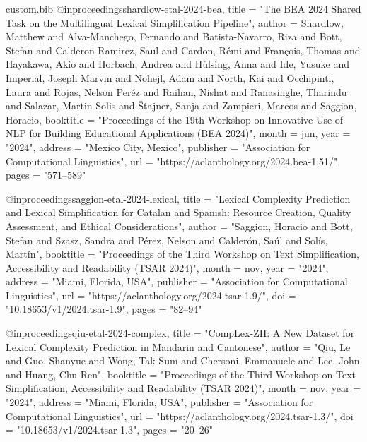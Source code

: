 \begin{filecontents*}[overwrite]{custom.bib}
@inproceedings{shardlow-etal-2024-bea,
    title = "The {BEA} 2024 Shared Task on the Multilingual Lexical Simplification Pipeline",
    author = {Shardlow, Matthew  and
      Alva-Manchego, Fernando  and
      Batista-Navarro, Riza  and
      Bott, Stefan  and
      Calderon Ramirez, Saul  and
      Cardon, R{\'e}mi  and
      Fran{\c{c}}ois, Thomas  and
      Hayakawa, Akio  and
      Horbach, Andrea  and
      H{\"u}lsing, Anna  and
      Ide, Yusuke  and
      Imperial, Joseph Marvin  and
      Nohejl, Adam  and
      North, Kai  and
      Occhipinti, Laura  and
      Rojas, Nelson Per{\'e}z  and
      Raihan, Nishat  and
      Ranasinghe, Tharindu  and
      Salazar, Martin Solis  and
      {\v{S}}tajner, Sanja  and
      Zampieri, Marcos  and
      Saggion, Horacio},
    booktitle = "Proceedings of the 19th Workshop on Innovative Use of NLP for Building Educational Applications (BEA 2024)",
    month = jun,
    year = "2024",
    address = "Mexico City, Mexico",
    publisher = "Association for Computational Linguistics",
    url = "https://aclanthology.org/2024.bea-1.51/",
    pages = "571--589"
}

@inproceedings{saggion-etal-2024-lexical,
    title = "Lexical Complexity Prediction and Lexical Simplification for {C}atalan and {S}panish: Resource Creation, Quality Assessment, and Ethical Considerations",
    author = "Saggion, Horacio  and
      Bott, Stefan  and
      Szasz, Sandra  and
      P{\'e}rez, Nelson  and
      Calder{\'o}n, Sa{\'u}l  and
      Sol{\'i}s, Mart{\'i}n",
    booktitle = "Proceedings of the Third Workshop on Text Simplification, Accessibility and Readability (TSAR 2024)",
    month = nov,
    year = "2024",
    address = "Miami, Florida, USA",
    publisher = "Association for Computational Linguistics",
    url = "https://aclanthology.org/2024.tsar-1.9/",
    doi = "10.18653/v1/2024.tsar-1.9",
    pages = "82--94"
}

@inproceedings{qiu-etal-2024-complex,
    title = "{C}omp{L}ex-{ZH}: A New Dataset for Lexical Complexity Prediction in {M}andarin and {C}antonese",
    author = "Qiu, Le  and
      Guo, Shanyue  and
      Wong, Tak-Sum  and
      Chersoni, Emmanuele  and
      Lee, John  and
      Huang, Chu-Ren",
    booktitle = "Proceedings of the Third Workshop on Text Simplification, Accessibility and Readability (TSAR 2024)",
    month = nov,
    year = "2024",
    address = "Miami, Florida, USA",
    publisher = "Association for Computational Linguistics",
    url = "https://aclanthology.org/2024.tsar-1.3/",
    doi = "10.18653/v1/2024.tsar-1.3",
    pages = "20--26"
}


\end{filecontents*}

